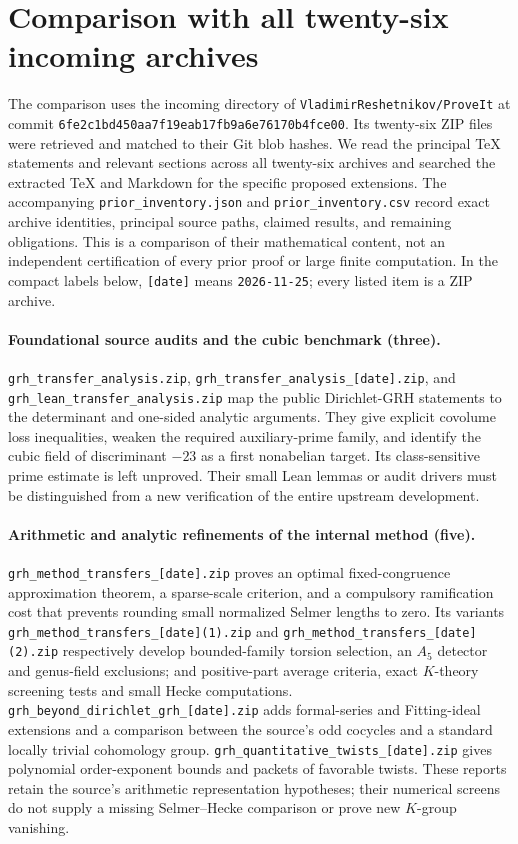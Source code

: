 \section{Comparison with all twenty-six incoming archives}
\label{app:prior-reports}

The comparison uses the incoming directory of \texttt{VladimirReshetnikov/ProveIt}
at commit \nolinkurl{6fe2c1bd450aa7f19eab17fb9a6e76170b4fce00}.
Its twenty-six ZIP files were retrieved and matched to their Git blob hashes.
We read the principal \TeX{} statements and relevant sections across all
twenty-six archives and searched the extracted \TeX{} and Markdown for the
specific proposed extensions. The accompanying
\nolinkurl{prior_inventory.json} and \nolinkurl{prior_inventory.csv}
record exact archive identities, principal source paths, claimed results,
and remaining obligations. This is a comparison of their mathematical
content, not an independent certification of every prior proof or large
finite computation. In the compact labels below, \texttt{[date]} means
\texttt{2026-11-25}; every listed item is a ZIP archive.

\paragraph{Foundational source audits and the cubic benchmark (three).}
\nolinkurl{grh_transfer_analysis.zip},
\nolinkurl{grh_transfer_analysis_[date].zip}, and
\nolinkurl{grh_lean_transfer_analysis.zip}
map the public Dirichlet-GRH statements to the determinant and one-sided
analytic arguments. They give explicit covolume loss inequalities,
weaken the required auxiliary-prime family, and identify the cubic field
of discriminant $-23$ as a first nonabelian target. Its class-sensitive
prime estimate is left unproved. Their small Lean lemmas or audit drivers
must be distinguished from a new verification of the entire upstream
development.

\paragraph{Arithmetic and analytic refinements of the internal method (five).}
\nolinkurl{grh_method_transfers_[date].zip} proves an optimal fixed-congruence
approximation theorem, a sparse-scale criterion, and a compulsory
ramification cost that prevents rounding small normalized Selmer lengths
to zero. Its variants
\nolinkurl{grh_method_transfers_[date](1).zip} and
\nolinkurl{grh_method_transfers_[date] (2).zip}
respectively develop bounded-family torsion selection, an $A_5$ detector
and genus-field exclusions; and positive-part average criteria, exact
$K$-theory screening tests and small Hecke computations.
\nolinkurl{grh_beyond_dirichlet_grh_[date].zip} adds formal-series and
Fitting-ideal extensions and a comparison between the source's odd
cocycles and a standard locally trivial cohomology group.
\nolinkurl{grh_quantitative_twists_[date].zip} gives polynomial
order-exponent bounds and packets of favorable twists. These reports
retain the source's arithmetic representation hypotheses; their
numerical screens do not supply a missing Selmer--Hecke comparison or
prove new $K$-group vanishing.

